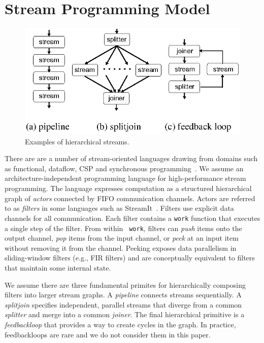 \section{Stream Programming Model}

\begin{figure}[t]
\begin{center}
 \includegraphics[scale=1, angle=0]{./constructs-eg.eps}
 \caption{Examples of hierarchical streams.}
 \label{fig:containers}
\end{center}
\end{figure}

There are are a number of stream-oriented languages drawing from
domains such as functional, dataflow, CSP and synchronous
programming~\cite{survey97}. We assume an architecture-independent
programming language for high-performance stream programming. The
language expresses computation as a structured hierarchical graph of
{\it actors} connected by FIFO communication channels. Actors are
referred to as {\it filters} in some languages such as
StreamIt~\cite{streamitcc,streamit-lang-spec}. Filters use explicit
data channels for all communication. Each filter contains a {\tt work}
function that executes a single step of the filter.  From within {\tt
work}, filters can {\it push} items onto the output channel, {\it pop}
items from the input channel, or {\it peek} at an input item without
removing it from the channel. Peeking exposes data parallelism in
sliding-window filters (e.g., FIR filters) and are conceptually
equivalent to filters that maintain some internal state.

We assume there are three fundamental primites for hierarchically
composing filters into larger stream graphs.  A {\it pipeline}
connects streams sequentially. A {\it splitjoin} specifies
independent, parallel streams that diverge from a common {\it
splitter} and merge into a common {\it joiner}. The final hierarchical
primitive is a {\it feedbackloop} that provides a way to create cycles
in the graph. In practice, feedbackloops are rare and we do not
consider them in this paper.

